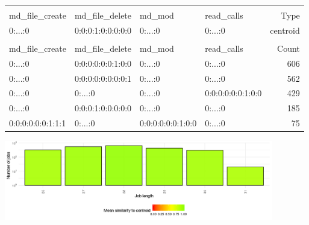 \documentclass[]{llncs}
\begin{document}
\begingroup
  \centering
  \begin{tiny}
    \begin{tabular}{@{ }l@{ }@{ }l@{ }@{ }l@{ }@{ }l@{ }|@{ }r@{ }}
      \rowcolor{tabhcolor}
      \multicolumn{4}{@{ }l|@{ }}{Hexadecimal coding} & \\
      \rowcolor{tabhcolor}
      md\_file\_create  & md\_file\_delete  & md\_mod           & read\_calls       & Type     \\
      \hline
      0:...:0           & 0:0:0:1:0:0:0:0:0 & 0:...:0           & 0:...:0           & centroid \\
      \multicolumn{5}{l}{}\\
      \rowcolor{tabhcolor}
      md\_file\_create  & md\_file\_delete  & md\_mod           & read\_calls       & Count    \\
      \hline
      0:...:0           & 0:0:0:0:0:0:1:0:0 & 0:...:0           & 0:...:0           & 606      \\
      0:...:0           & 0:0:0:0:0:0:0:0:1 & 0:...:0           & 0:...:0           & 562      \\
      0:...:0           & 0:...:0           & 0:...:0           & 0:0:0:0:0:0:1:0:0 & 429      \\
      0:...:0           & 0:0:0:1:0:0:0:0:0 & 0:...:0           & 0:...:0           & 185      \\
      0:0:0:0:0:0:1:1:1 & 0:...:0           & 0:0:0:0:0:0:1:0:0 & 0:...:0           & 75       \\
    \end{tabular}
  \end{tiny}
  \label{tab:hex_lev:top_jobs}
\endgroup

\begingroup
  \centering
  \includegraphics[width=4.61in,height=1.39in]{./media/image5.png}
  \label{fig:hex_lev:length}
\endgroup
\end{document}
